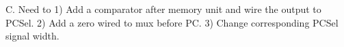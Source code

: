 \begin{blocksection}
\begin{parts}
\begin{solution}[0.5in]
 C. Need to 1) Add a comparator after memory unit and wire the output to PCSel. 2) Add a zero wired to mux before PC. 3) Change corresponding PCSel signal width.
\end{solution}
\newline
\newline
\newline
\newline
\newline
\newline
\newline
\newline
\end{parts}

\end{blocksection}